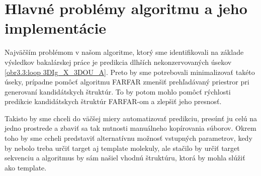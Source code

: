\section{Hlavné problémy algoritmu a jeho implementácie}
Najväčším problémom v našom algoritme, ktorý sme identifikovali na základe výsledkov bakalárskej práce je predikcia dlhších nekonzervovaných úsekov \ref{obr3.3:loop 3DIg_X_3DOU_A}. Preto by sme potrebovali minimalizovať takéto úseky, prípadne pomôcť algoritmu FARFAR zmenšiť prehľadávaný priestror pri generovaní kandidátskych štruktúr. To by potom mohlo pomôcť rýchlosti predikcie kandidátskych štruktúr FARFAR-om a zlepšiť jeho presnosť.

\indent Takisto by sme chceli do väčšej miery automatizovať predikciu, presúnť ju celú na jedno prostrede a zbaviť sa tak nutnosti manuálneho kopírovania súborov. Okrem toho by sme ccheli predstaviť alternatívnu možnosť vstupných parametrov, kedy by nebolo treba určiť target aj template molekuly, ale stačilo by určiť target sekvenciu a algoritmus by sám našiel vhodnú štruktúru, ktorá by mohla slúžiť ako template. 
